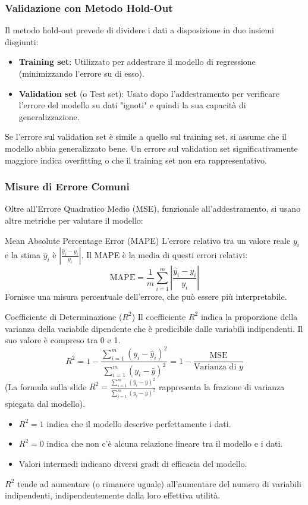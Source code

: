 \documentclass{article}
\begin{document}
\subsubsection{Validazione con Metodo Hold-Out}
Il metodo hold-out prevede di dividere i dati a disposizione in due insiemi disgiunti:
\begin{itemize}
    \item \textbf{Training set}: Utilizzato per addestrare il modello di regressione (minimizzando l'errore su di esso).
    \item \textbf{Validation set} (o Test set): Usato dopo l'addestramento per verificare l'errore del modello su dati "ignoti" e quindi la sua capacità di generalizzazione.
\end{itemize}
Se l'errore sul validation set è simile a quello sul training set, si assume che il modello abbia generalizzato bene. Un errore sul validation set significativamente maggiore indica overfitting o che il training set non era rappresentativo.

\subsubsection{Misure di Errore Comuni}
Oltre all'Errore Quadratico Medio (MSE), funzionale all'addestramento, si usano altre metriche per valutare il modello:

\begin{definitionbox}{Mean Absolute Percentage Error (MAPE)}
    L'errore relativo tra un valore reale $y_i$ e la stima $\hat{y}_i$ è $|\frac{\hat{y}_i - y_i}{y_i}|$. Il MAPE è la media di questi errori relativi:
    $$ \text{MAPE} = \frac{1}{m} \sum_{i=1}^{m} \left| \frac{\hat{y}_i - y_i}{y_i} \right| $$
    Fornisce una misura percentuale dell'errore, che può essere più interpretabile.
\end{definitionbox}

\begin{definitionbox}{Coefficiente di Determinazione ($R^2$)}
    Il coefficiente $R^2$ indica la proporzione della varianza della variabile dipendente che è predicibile dalle variabili indipendenti. Il suo valore è compreso tra 0 e 1.
    $$ R^2 = 1 - \frac{\sum_{i=1}^{m} (y_i - \hat{y}_i)^2}{\sum_{i=1}^{m} (y_i - \bar{y})^2} = 1 - \frac{\text{MSE}}{\text{Varianza di } y} $$
    (La formula sulla slide $R^{2}=\frac{\sum_{i=1}^{m}(\hat{y}_{i}-\overline{y})^{2}}{\sum_{i=1}^{m}(y_{i}-\overline{y})^{2}}$  rappresenta la frazione di varianza spiegata dal modello).
    \begin{itemize}
        \item $R^2 = 1$ indica che il modello descrive perfettamente i dati.
        \item $R^2 = 0$ indica che non c'è alcuna relazione lineare tra il modello e i dati.
        \item Valori intermedi indicano diversi gradi di efficacia del modello.
    \end{itemize}
    $R^2$ tende ad aumentare (o rimanere uguale) all'aumentare del numero di variabili indipendenti, indipendentemente dalla loro effettiva utilità.
\end{definitionbox}
\end{document}
